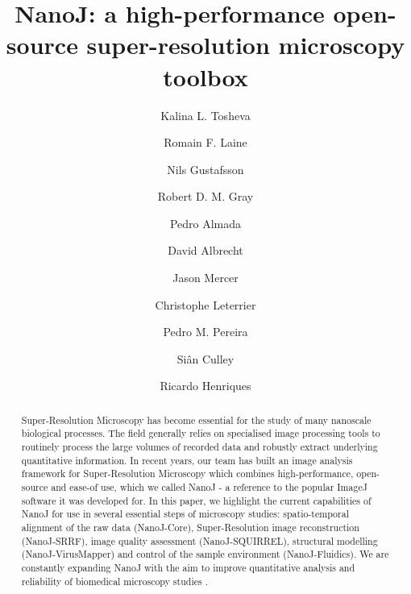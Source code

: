 

\title{NanoJ: a high-performance open-source super-resolution microscopy toolbox}

\author[1,2\space *]{Kalina L. Tosheva}
\author[1-3\space *]{Romain F. Laine}
\author[1,2,4]{Nils Gustafsson}
\author[1,2,4]{Robert D. M. Gray}
\author[1,2]{Pedro Almada}
\author[1]{David Albrecht}
\author[1]{Jason Mercer}
\author[5]{Christophe Leterrier}
\author[1-3\space\Letter]{Pedro M. Pereira}
\author[1-3\space\Letter]{Si\^{a}n Culley}
\author[1-3\space\Letter]{Ricardo Henriques}



\maketitle

\begin{abstract}

Super-Resolution Microscopy has become essential for the study of many nanoscale biological processes. The field generally relies on specialised image processing tools to routinely process the large volumes of recorded data and robustly extract underlying quantitative information. In recent years, our team has built an image analysis framework for Super-Resolution Microscopy which combines high-performance, open-source and ease-of use, which we called NanoJ - a reference to the popular ImageJ software it was developed for. In this paper, we highlight the current capabilities of NanoJ for use in several essential steps of microscopy studies: spatio-temporal alignment of the raw data (NanoJ-Core), Super-Resolution image reconstruction (NanoJ-SRRF), image quality assessment (NanoJ-SQUIRREL), structural modelling (NanoJ-VirusMapper) and control of the sample environment (NanoJ-Fluidics). We are constantly expanding NanoJ with the aim to improve quantitative analysis and reliability of biomedical microscopy studies .

\end {abstract}


